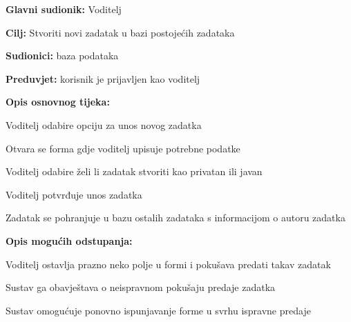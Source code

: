 										
										
					\noindent {}
					\begin{packed_item}
						
						\item \textbf{Glavni sudionik: }Voditelj
						\item \textbf{Cilj:} Stvoriti novi zadatak u bazi postojećih zadataka
						\item \textbf{Sudionici:} baza podataka
						\item \textbf{Preduvjet:} korisnik je prijavljen kao voditelj
						\item \textbf{Opis osnovnog tijeka:}
						
						\item[] \begin{packed_enum}
							\item Voditelj odabire opciju za unos novog zadatka
							\item Otvara se forma gdje voditelj upisuje potrebne podatke
							\item Voditelj odabire želi li zadatak stvoriti kao privatan ili javan
							\item Voditelj potvrđuje unos zadatka
							\item Zadatak se pohranjuje u bazu ostalih zadataka s informacijom o autoru zadatka
						\end{packed_enum}
						
						\item  \textbf{Opis mogućih odstupanja:}
						\item[] \begin{packed_item}
							
							\item[2.a] Voditelj ostavlja prazno neko polje u formi i pokušava predati takav zadatak
							\item[] \begin{packed_enum}
								
								\item Sustav ga obavještava o neispravnom pokušaju predaje zadatka 
								\item Sustav omogućuje ponovno ispunjavanje forme u svrhu ispravne predaje
								
							\end{packed_enum}
						\end{packed_item}
					\end{packed_item}
					
